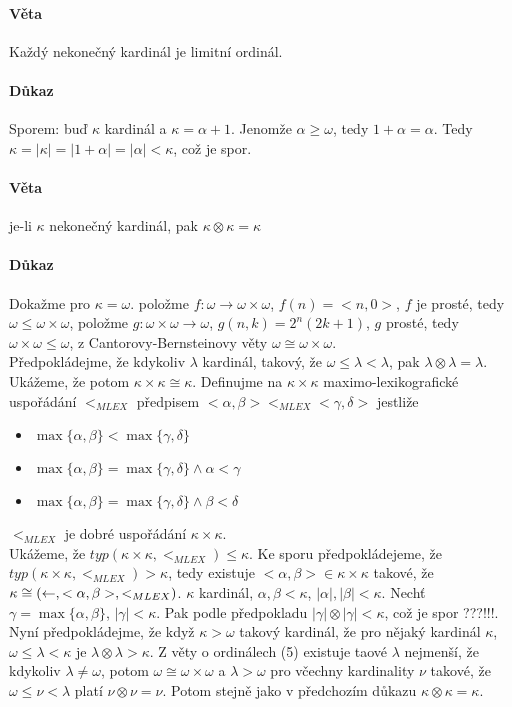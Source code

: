 \documentclass[a4paper,12pt,titlepage]{article}
\begin{document}
\paragraph{Věta}
Každý nekonečný kardinál je limitní ordinál.
\paragraph{Důkaz}
Sporem: buď $\kappa$ kardinál a $\kappa = \alpha + 1$. Jenomže $\alpha \ge
\omega$, tedy $1 + \alpha = \alpha$. Tedy $\kappa = |\kappa| = |1+\alpha| =
|\alpha| < \kappa$, což je spor.

\paragraph{Věta}
je-li $\kappa$ nekonečný kardinál, pak $\kappa \otimes \kappa = \kappa$
\paragraph{Důkaz}
Dokažme pro $\kappa = \omega$. položme $f: \omega \to \omega \times \omega$, 
$f(n) = <n, 0>$, $f$ je prosté, tedy $\omega \le \omega \times \omega$, položme 
$g: \omega \times \omega \to \omega$, $g(n, k) = 2^n (2k + 1)$, $g$ prosté, tedy
$\omega \times \omega \le \omega$, z Cantorovy-Bernsteinovy věty 
$\omega \cong \omega \times \omega$. \\
Předpokládejme, že kdykoliv $\lambda$ kardinál, takový, že $\omega \le \lambda < 
\lambda$, pak $\lambda \otimes \lambda = \lambda$. Ukážeme, že potom $\kappa 
\times \kappa \cong \kappa$. Definujme na $\kappa \times \kappa$ maximo-lexikografické
uspořádání $<_{MLEX}$ předpisem $<\alpha, \beta> <_{MLEX} <\gamma, \delta>$ jestliže
\begin{itemize}
	\item $\max\{\alpha, \beta\} < \max\{\gamma, \delta\}$ 
	\item $\max\{\alpha, \beta\} = \max\{\gamma, \delta\} \land \alpha < \gamma$ 
	\item $\max\{\alpha, \beta\} = \max\{\gamma, \delta\} \land \beta < \delta$
\end{itemize}
$<_{MLEX}$ je dobré uspořádání $\kappa \times \kappa$. \\
Ukážeme, že $typ (\kappa \times \kappa, <_{MLEX}) \le \kappa$. Ke sporu předpokládejeme,
že $typ (\kappa \times \kappa, <_{MLEX}) > \kappa$, tedy existuje $<\alpha, \beta> 
\in \kappa \times \kappa$ takové, že $\kappa \cong (\leftarrow, <\alpha, \beta>, <_{MLEX} )$.
$\kappa$ kardinál, $\alpha, \beta < \kappa$, $|\alpha|, |\beta| < \kappa$.
Nechť $\gamma = \max\{ \alpha, \beta \}$, $|\gamma| < \kappa$. Pak podle předpokladu 
$|\gamma| \otimes |\gamma| < \kappa$, což je spor ???!!!. \\
Nyní předpokládejme, že když $\kappa > \omega$ takový kardinál, že pro nějaký kardinál $\kappa$,
$\omega \le \lambda < \kappa$ je $\lambda \otimes \lambda > \kappa$. Z věty o ordinálech (5)
existuje taové $\lambda$ nejmenší, že kdykoliv $\lambda \ne \omega$, potom $\omega \cong 
\omega \times \omega$ a $\lambda > \omega$ pro včechny kardinality $\nu$ takové, že  $\omega
 \le \nu < \lambda$ platí $\nu \otimes \nu = \nu$. Potom stejně jako v předchozím důkazu
$\kappa \otimes \kappa = \kappa$.
\end{document}
